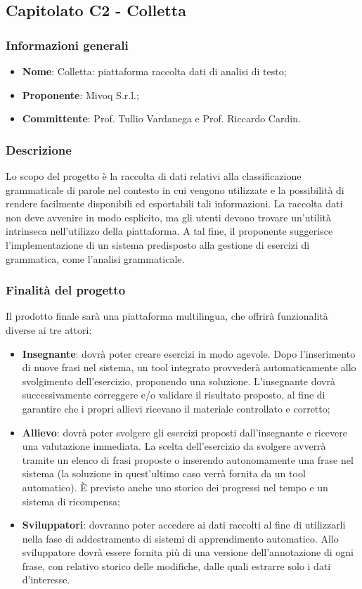 \subsection{Capitolato C2 - Colletta}
\subsubsection{Informazioni generali}
\begin{itemize}
	\item \textbf{Nome}: Colletta: piattaforma raccolta dati di analisi di testo;
	\item \textbf{Proponente}: Mivoq S.r.l.;
	\item \textbf{Committente}: Prof. Tullio Vardanega e Prof. Riccardo Cardin.
\end{itemize}

\subsubsection{Descrizione}
Lo scopo del progetto è la raccolta di dati relativi alla classificazione grammaticale di parole nel
contesto in cui vengono utilizzate e la possibilità di rendere facilmente disponibili ed esportabili
tali informazioni. La raccolta dati non deve avvenire in modo esplicito, ma gli utenti devono
trovare un’utilità intrinseca nell’utilizzo della piattaforma. A tal fine, il proponente suggerisce
l’implementazione di un sistema predisposto alla gestione di esercizi di grammatica, come l’analisi grammaticale. 

 
\subsubsection{Finalità del progetto}
Il prodotto finale sarà una piattaforma multilingua, che offrirà funzionalità diverse ai tre attori:

\begin{itemize}
	\item \textbf{Insegnante}: dovrà poter creare esercizi in modo agevole. Dopo l'inserimento di nuove frasi
	 nel sistema, un tool integrato provvederà automaticamente allo svolgimento
	 dell'esercizio, proponendo una soluzione. L'insegnante dovrà 
	 successivamente correggere e/o validare il risultato proposto, al fine di
	 garantire che i propri allievi ricevano il materiale controllato e corretto;
	\item \textbf{Allievo}:
	dovrà poter svolgere gli esercizi proposti
	dall'insegnante e ricevere una valutazione immediata. La scelta
	dell'esercizio da svolgere avverrà tramite un elenco di frasi proposte o
	inserendo autonomamente una frase nel sistema (la soluzione in quest'ultimo caso verrà fornita da un tool automatico). \`E previsto
    anche uno storico dei progressi nel tempo e un sistema di ricompensa;
	\item \textbf{Sviluppatori}: dovranno poter accedere ai dati
	raccolti al fine di utilizzarli nella fase di addestramento di sistemi di apprendimento automatico. Allo sviluppatore dovrà essere fornita più di una versione dell'annotazione di ogni frase, con relativo storico delle modifiche, dalle quali estrarre solo i dati d'interesse.
\end{itemize}
